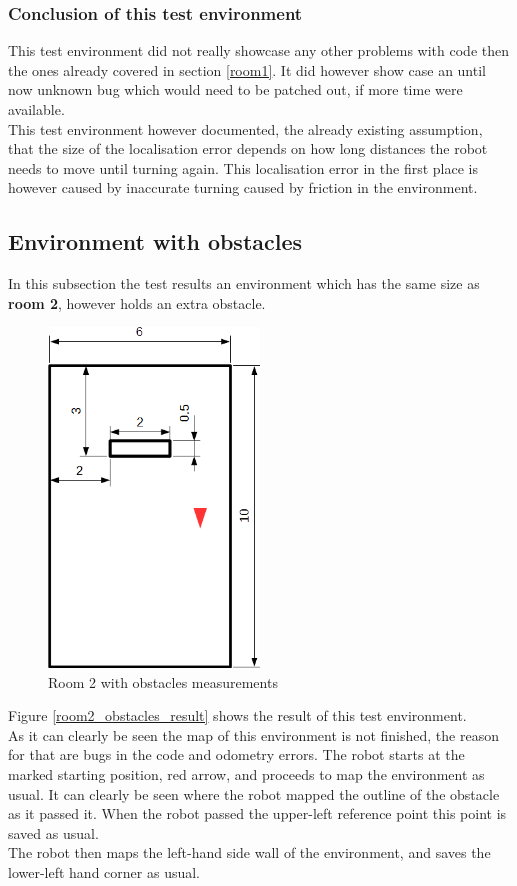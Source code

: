 \subsubsection{Conclusion of this test environment}
This test environment did not really showcase any other problems with code then the ones already covered in section \ref{room1}. It did however show case an until now unknown bug which would need to be patched out, if more time were available.\\
This test environment however documented, the already existing assumption, that the size of the localisation error depends on how long distances the robot needs to move until turning again. This localisation error in the first place is however caused by inaccurate turning caused by friction in the environment. 

\subsection{Environment with obstacles}
In this subsection the test results an environment which has the same size as \textbf{room 2}, however holds an extra obstacle.\\

\begin{figure}[h]
\centering
\includegraphics[width = 0.5\textwidth]{../../figures/room2_obstacle.png} 
\caption{Room 2 with obstacles measurements}
\label{room2_obstacles}
\end{figure}

Figure \ref{room2_obstacles_result} shows the result of this test environment. \\
As it can clearly be seen the map of this environment is not finished, the reason for that are bugs in the code and odometry errors.
The robot starts at the marked starting position, red arrow, and proceeds to map the environment as usual. It can clearly be seen where the robot mapped the outline of the obstacle as it passed it. When the robot passed the upper-left reference point this point is saved as usual. \\
The robot then maps the left-hand side wall of the environment, and saves the lower-left hand corner as usual.\\

